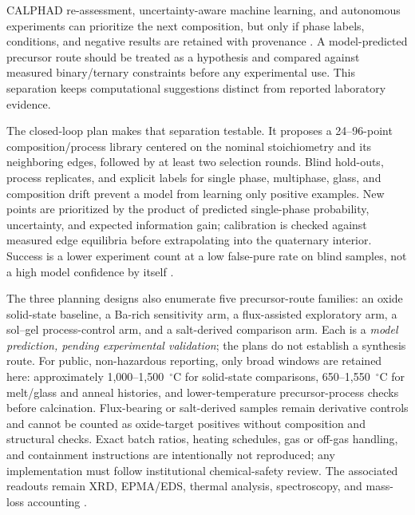CALPHAD re-assessment, uncertainty-aware machine learning, and autonomous experiments can prioritize the next composition, but only if phase labels, conditions, and negative results are retained with provenance \cite{arroyave2022phase,tsutsui2021a,chen2024navigating,choi2026ai,zhang2026provmind}. A model-predicted precursor route should be treated as a hypothesis and compared against measured binary\slash ternary constraints before any experimental use. This separation keeps computational suggestions distinct from reported laboratory evidence.

The closed-loop plan makes that separation testable. It proposes a 24--96-point
composition\slash process library centered on the nominal stoichiometry and its
neighboring edges, followed by at least two selection rounds. Blind hold-outs,
process replicates, and explicit labels for single phase, multiphase, glass, and
composition drift prevent a model from learning only positive examples. New
points are prioritized by the product of predicted single-phase probability,
uncertainty, and expected information gain; calibration is checked against
measured edge equilibria before extrapolating into the quaternary interior.
Success is a lower experiment count at a low false-pure rate on blind samples,
not a high model confidence by itself \cite{chen2024navigating,wang2022dataset,huo2022machine,gong2022calibrating}.

The three planning designs also enumerate five precursor-route families:
an oxide solid-state baseline, a Ba-rich sensitivity arm, a flux-assisted
exploratory arm, a sol--gel process-control arm, and a salt-derived comparison
arm. Each is a \emph{model prediction, pending experimental validation}; the
plans do not establish a synthesis route. For public, non-hazardous reporting,
only broad windows are retained here: approximately 1,000--1,500~$^{\circ}$C
for solid-state comparisons, 650--1,550~$^{\circ}$C for melt\slash glass and anneal
histories, and lower-temperature precursor-process checks before calcination.
Flux-bearing or salt-derived samples remain derivative controls and cannot be
counted as oxide-target positives without composition and structural checks.
Exact batch ratios, heating schedules, gas or off-gas handling, and containment
instructions are intentionally not reproduced; any implementation must follow
institutional chemical-safety review. The associated readouts remain XRD,
EPMA\slash EDS, thermal analysis, spectroscopy, and mass-loss accounting
\cite{parsa2018synthesis,bugaris2012materials,ranganathan2008sol,boyer2003yttrium,huo2022machine}.

